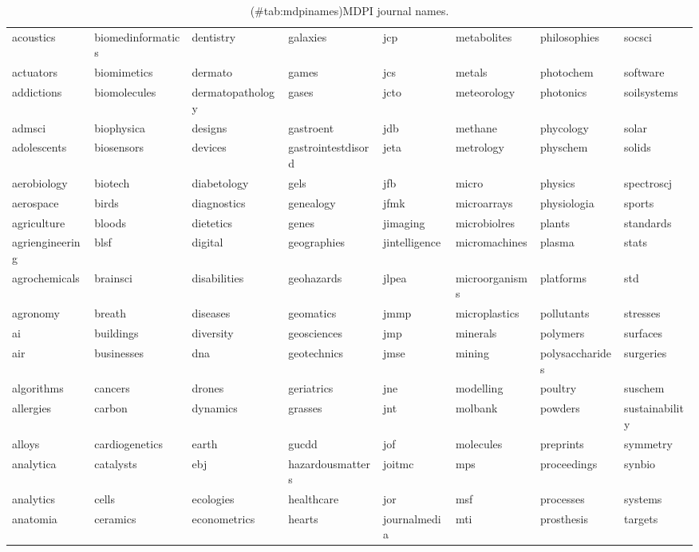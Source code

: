 \documentclass[
]{article}
\begin{document}
\begin{longtable}[t]{llllllll}
\caption{(\#tab:mdpinames)MDPI journal names.}\\
\toprule
acoustics & biomedinformatics & dentistry & galaxies & jcp & metabolites & philosophies & socsci\\
actuators & biomimetics & dermato & games & jcs & metals & photochem & software\\
addictions & biomolecules & dermatopathology & gases & jcto & meteorology & photonics & soilsystems\\
admsci & biophysica & designs & gastroent & jdb & methane & phycology & solar\\
adolescents & biosensors & devices & gastrointestdisord & jeta & metrology & physchem & solids\\
\addlinespace
aerobiology & biotech & diabetology & gels & jfb & micro & physics & spectroscj\\
aerospace & birds & diagnostics & genealogy & jfmk & microarrays & physiologia & sports\\
agriculture & bloods & dietetics & genes & jimaging & microbiolres & plants & standards\\
agriengineering & blsf & digital & geographies & jintelligence & micromachines & plasma & stats\\
agrochemicals & brainsci & disabilities & geohazards & jlpea & microorganisms & platforms & std\\
\addlinespace
agronomy & breath & diseases & geomatics & jmmp & microplastics & pollutants & stresses\\
ai & buildings & diversity & geosciences & jmp & minerals & polymers & surfaces\\
air & businesses & dna & geotechnics & jmse & mining & polysaccharides & surgeries\\
algorithms & cancers & drones & geriatrics & jne & modelling & poultry & suschem\\
allergies & carbon & dynamics & grasses & jnt & molbank & powders & sustainability\\
\addlinespace
alloys & cardiogenetics & earth & gucdd & jof & molecules & preprints & symmetry\\
analytica & catalysts & ebj & hazardousmatters & joitmc & mps & proceedings & synbio\\
analytics & cells & ecologies & healthcare & jor & msf & processes & systems\\
anatomia & ceramics & econometrics & hearts & journalmedia & mti & prosthesis & targets\\

\end{longtable}
\end{document}
